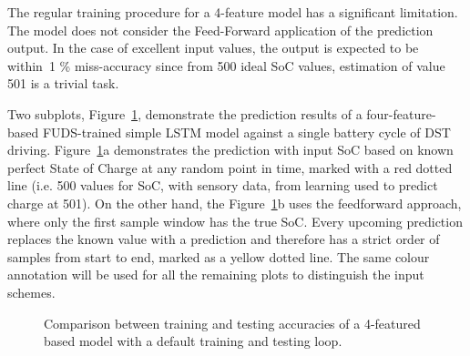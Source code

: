 The regular training procedure for a 4-feature model has a significant limitation. The model does not consider the Feed-Forward application of the prediction output.
In the case of excellent input values, the output is expected to be within~1 \% miss-accuracy since from 500 ideal SoC values, estimation of value 501 is a trivial task.

%
%
Two subplots, \mbox{Figure~\ref{fig:regular_tr}}, demonstrate the prediction results of a four-feature-based FUDS-trained simple LSTM model against a single battery cycle of DST driving.
\mbox{Figure~\ref{fig:regular_tr}a} demonstrates the prediction with input SoC based on known perfect State of Charge at any random point in time, marked with a red dotted line (i.e. 500 values for SoC, with sensory data, from learning used to predict charge at 501).
On the other hand, the \mbox{Figure~\ref{fig:regular_tr}b} uses the feedforward approach, where only the first sample window has the true SoC.
Every upcoming prediction replaces the known value with a prediction and therefore has a strict order of samples from start to end, marked as a yellow dotted line.
The same colour annotation will be used for all the remaining plots to distinguish the input schemes.
 {
    \begin{figure}[!t]
        \centering
        \hfill
        \caption{Comparison between training and testing accuracies of a 4-featured based model with a default training and testing loop.}
        \label{fig:regular_tr}
    \end{figure}
}

